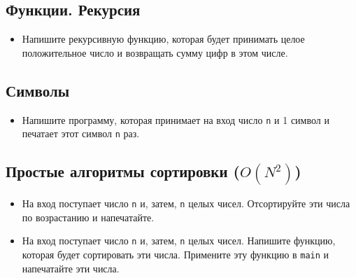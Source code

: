 \documentclass{article}
\begin{document}
\subsection*{Функции. Рекурсия}
\begin{itemize}
\item Напишите рекурсивную функцию, которая будет принимать целое положительное число и возвращать сумму цифр в этом числе.
\end{itemize}

\subsection*{Символы}
\begin{itemize}
\item Напишите программу, которая принимает на вход число \texttt{n} и 1 символ и печатает этот символ \texttt{n} раз.
\end{itemize}

\subsection*{Простые алгоритмы сортировки ($O(N^2)$)}
\begin{itemize}
\item На вход поступает число \texttt{n} и, затем, \texttt{n} целых чисел. Отсортируйте эти числа по возрастанию и напечатайте.
\item На вход поступает число \texttt{n} и, затем, \texttt{n} целых чисел. Напишите функцию, которая будет сортировать эти числа. Примените эту функцию в \texttt{main} и напечатайте эти числа.
\end{itemize}
\end{document}

